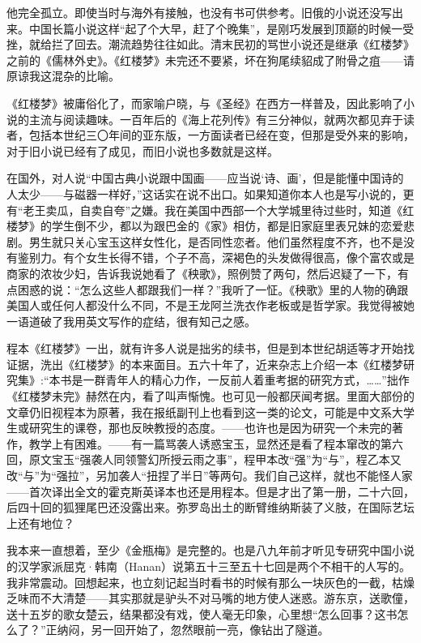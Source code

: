 \par 他完全孤立。即使当时与海外有接触，也没有书可供参考。旧俄的小说还没写出来。中国长篇小说这样“起了个大早，赶了个晚集”，是刚巧发展到顶巅的时候一受挫，就给拦了回去。潮流趋势往往如此。清末民初的骂世小说还是继承《红楼梦》之前的《儒林外史》。《红楼梦》未完还不要紧，坏在狗尾续貂成了附骨之疽——请原谅我这混杂的比喻。
\par 《红楼梦》被庸俗化了，而家喻户晓，与《圣经》在西方一样普及，因此影响了小说的主流与阅读趣味。一百年后的《海上花列传》有三分神似，就两次都见弃于读者，包括本世纪三〇年间的亚东版，一方面读者已经在变，但那是受外来的影响，对于旧小说已经有了成见，而旧小说也多数就是这样。
\par 在国外，对人说“中国古典小说跟中国画——应当说‘诗、画’，但是能懂中国诗的人太少——与磁器一样好，”这话实在说不出口。如果知道你本人也是写小说的，更有“老王卖瓜，自卖自夸”之嫌。我在美国中西部一个大学城里待过些时，知道《红楼梦》的学生倒不少，都以为跟巴金的《家》相仿，都是旧家庭里表兄妹的恋爱悲剧。男生就只关心宝玉这样女性化，是否同性恋者。他们虽然程度不齐，也不是没有鉴别力。有个女生长得不错，个子不高，深褐色的头发做得很高，像个富农或是商家的浓妆少妇，告诉我说她看了《秧歌》，照例赞了两句，然后迟疑了一下，有点困惑的说：“怎么这些人都跟我们一样？”我听了一怔。《秧歌》里的人物的确跟美国人或任何人都没什么不同，不是王龙阿兰洗衣作老板或是哲学家。我觉得被她一语道破了我用英文写作的症结，很有知己之感。
\par 程本《红楼梦》一出，就有许多人说是拙劣的续书，但是到本世纪胡适等才开始找证据，洗出《红楼梦》的本来面目。五六十年了，近来杂志上介绍一本《红楼梦研究集》:“本书是一群青年人的精心力作，一反前人着重考据的研究方式，……”拙作《红楼梦未完》赫然在内，看了叫声惭愧。也可见一般都厌闻考据。里面大部份的文章仍旧视程本为原著，我在报纸副刊上也看到这一类的论文，可能是中文系大学生或研究生的课卷，那也反映教授的态度。——也许也是因为研究一个未完的著作，教学上有困难。——有一篇骂袭人诱惑宝玉，显然还是看了程本窜改的第六回，原文宝玉“强袭人同领警幻所授云雨之事”，程甲本改“强”为“与”，程乙本又改“与”为“强拉”，另加袭人“扭捏了半日”等两句。我们自己这样，就也不能怪人家——首次译出全文的霍克斯英译本也还是用程本。但是才出了第一册，二十六回，后四十回的狐狸尾巴还没露出来。弥罗岛出土的断臂维纳斯装了义肢，在国际艺坛上还有地位？
\par 我本来一直想着，至少《金瓶梅》是完整的。也是八九年前才听见专研究中国小说的汉学家派屈克·韩南（Hanan）说第五十三至五十七回是两个不相干的人写的。我非常震动。回想起来，也立刻记起当时看书的时候有那么一块灰色的一截，枯燥乏味而不大清楚——其实那就是驴头不对马嘴的地方使人迷惑。游东京，送歌僮，送十五岁的歌女楚云，结果都没有戏，使人毫无印象，心里想“怎么回事？这书怎么了？”正纳闷，另一回开始了，忽然眼前一亮，像钻出了隧道。
